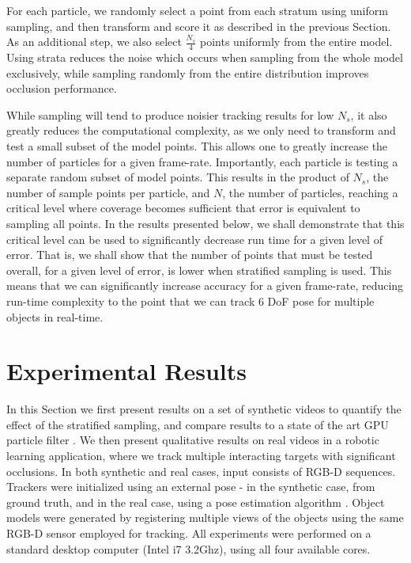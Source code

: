 For each particle, we randomly select a point from each stratum using uniform sampling, and then transform and score it as described in the previous Section. As an additional step, we also select $\frac{N_s}{4}$ points uniformly from the entire model. Using strata reduces the noise which occurs when sampling from the whole model exclusively, while sampling randomly from the entire distribution improves occlusion performance. 

While sampling will tend to produce noisier tracking results for low $N_s$, it also greatly reduces the computational complexity, as we only need to transform and test a small subset of the model points. This allows one to greatly increase the number of particles for a given frame-rate. Importantly, each particle is testing a separate random subset of model points. This results in the product of $N_s$, the number of sample points per particle, and $N$, the number of particles, reaching a critical level where coverage becomes sufficient that error is equivalent to sampling all points. In the results presented below, we shall demonstrate that this critical level can be used to significantly decrease run time for a given level of error. That is, we shall show that the number of points that must be tested overall, for a given level of error, is lower when stratified sampling is used. This means that we can significantly increase accuracy for a given frame-rate, reducing run-time complexity to the point that we can track 6 DoF pose for multiple objects in real-time.   

\section{Experimental Results}
\label{sec:ExperimentalResults}
In this Section we first present results on a set of synthetic videos to quantify the effect of the stratified sampling, and compare results to a state of the art GPU particle filter \cite{Choi_IROS2013}. We then present qualitative results on real videos in a robotic learning application, where we track multiple interacting targets with significant occlusions. In both synthetic and real cases, input consists of RGB-D sequences. Trackers were initialized using an external pose - in the synthetic case, from ground truth, and in the real case, using a pose estimation algorithm \cite{Buch_CVPR2014}. Object models were generated by registering multiple views of the objects using the same RGB-D sensor employed for tracking. All experiments were performed on a standard desktop computer (Intel i7 3.2Ghz), using all four available cores.

